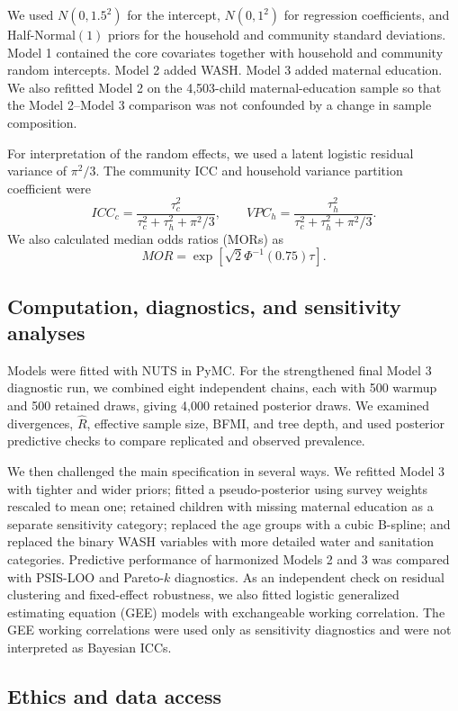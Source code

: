 \documentclass[11pt]{article}
\begin{document}
We used $N(0,1.5^2)$ for the intercept, $N(0,1^2)$ for regression coefficients, and Half-Normal$(1)$ priors for the household and community standard deviations. Model 1 contained the core covariates together with household and community random intercepts. Model 2 added WASH. Model 3 added maternal education. We also refitted Model 2 on the 4,503-child maternal-education sample so that the Model 2--Model 3 comparison was not confounded by a change in sample composition.

For interpretation of the random effects, we used a latent logistic residual variance of $\pi^2/3$. The community ICC and household variance partition coefficient were
\[
ICC_c=
\frac{\tau_c^2}{\tau_c^2+\tau_h^2+\pi^2/3},
\qquad
VPC_h=
\frac{\tau_h^2}{\tau_c^2+\tau_h^2+\pi^2/3}.
\]
We also calculated median odds ratios (MORs) as
\[
MOR=\exp\left[\sqrt{2}\Phi^{-1}(0.75)\tau\right].
\]

\subsection{Computation, diagnostics, and sensitivity analyses}

Models were fitted with NUTS in PyMC. For the strengthened final Model 3 diagnostic run, we combined eight independent chains, each with 500 warmup and 500 retained draws, giving 4,000 retained posterior draws. We examined divergences, $\hat R$, effective sample size, BFMI, and tree depth, and used posterior predictive checks to compare replicated and observed prevalence.

We then challenged the main specification in several ways. We refitted Model 3 with tighter and wider priors; fitted a pseudo-posterior using survey weights rescaled to mean one; retained children with missing maternal education as a separate sensitivity category; replaced the age groups with a cubic B-spline; and replaced the binary WASH variables with more detailed water and sanitation categories. Predictive performance of harmonized Models 2 and 3 was compared with PSIS-LOO and Pareto-$k$ diagnostics. As an independent check on residual clustering and fixed-effect robustness, we also fitted logistic generalized estimating equation (GEE) models with exchangeable working correlation. The GEE working correlations were used only as sensitivity diagnostics and were not interpreted as Bayesian ICCs.

\subsection{Ethics and data access}
\end{document}
